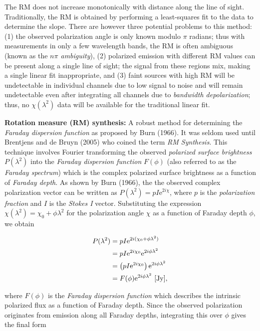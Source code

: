 \documentclass[a4paper,10pt]{article}
\begin{document}
{\noindent}The RM does not increase monotonically with distance along the line of sight. Traditionally, the RM is obtained by performing a least-squares fit to the data to determine the slope. There are however three potential problems to this method: (1) the observed polarization angle is only known modulo $\pi$ radians; thus with measurements in only a few wavelength bands, the RM is often ambiguous (known as the \textit{$n\pi$ ambiguity}), (2) polarized emission with different RM values can be present along a single line of sight; the signal from these regions mix, making a single linear fit inappropriate, and (3) faint sources with high RM will be undetectable in individual channels due to low signal to noise and will remain undetectable even after integrating all channels due to \textit{bandwidth depolarization}; thus, no $\chi(\lambda^2)$ data will be available for the traditional linear fit.

{\noindent}\textbf{Rotation measure (RM) synthesis:} A robust method for determining the \textit{Faraday dispersion function} as proposed by Burn (1966). It was seldom used until Brentjens and de Bruyn (2005) who coined the term \textit{RM Synthesis}. This technique involves Fourier transforming the observed \textit{polarized surface brightness} $P(\lambda^2)$ into the \textit{Faraday dispersion function} $F(\phi)$ (also referred to as the \textit{Faraday spectrum}) which is the complex polarized surface brightness as a function of \textit{Faraday depth}. As shown by Burn (1966), the the observed complex polarization vector can be written as $P(\lambda^2)=pI\mathrm{e}^{2i\chi}$, where $p$ is the \textit{polarization fraction} and $I$ is the \textit{Stokes I} vector. Substituting the expression $\chi(\lambda^2)=\chi_0+\phi\lambda^2$ for the polarization angle $\chi$ as a function of Faraday depth $\phi$, we obtain

\begin{align*}
    P(\lambda^2) &= pI\mathrm{e}^{2i(\chi_0+\phi\lambda^2)}\\
    &= pI\mathrm{e}^{2i\chi_0}\mathrm{e}^{2i\phi\lambda^2}\\
    &= \left(pI\mathrm{e}^{2i\chi_0}\right)\mathrm{e}^{2i\phi\lambda^2}\\
    &= F(\phi)\mathrm{e}^{2i\phi\lambda^2} ~ [{\rm Jy}],
\end{align*}

{\noindent}where $F(\phi)$ is the \textit{Faraday dispersion function} which describes the intrinsic polarized flux as a function of Faraday depth. Since the observed polarization originates from emission along all Faraday depths, integrating this over $\phi$ gives the final form
\end{document}
